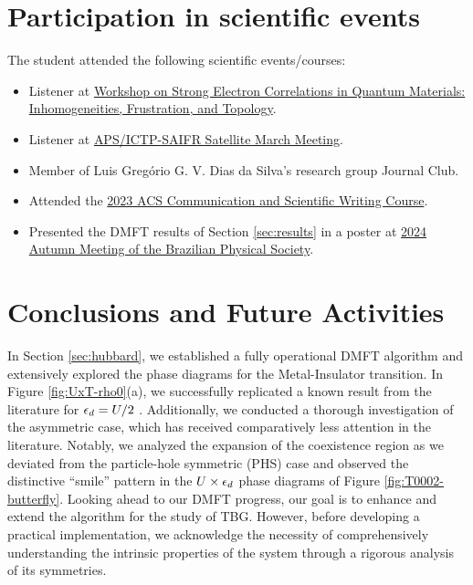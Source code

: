 \documentclass[12pt]{report}
\begin{document}
\chapter{Participation in scientific events} \label{chp:particEvento}

The student attended the following scientific events/courses:

\begin{itemize}
\item Listener at \href{https://www.ictp-saifr.org/qm2023/}{Workshop on Strong Electron Correlations in Quantum Materials: Inhomogeneities, Frustration, and Topology}.
\item Listener at \href{https://www.ictp-saifr.org/apsmarch23/}{APS/ICTP-SAIFR Satellite March Meeting}.
\item Member of Luis Gregório G. V. Dias da Silva's research group Journal Club.
\item Attended the \href{https://american-chemical-society.zoom.us/webinar/register/WN_FISEv0_ySkK2jPVB0nbsRw#/registration}{2023 ACS Communication and Scientific Writing Course}.
\item Presented the DMFT results of Section \ref{sec:results} in a poster at \href{https://www1.fisica.org.br/~eosbf/2024/index.php/en/}{2024 Autumn Meeting of the Brazilian Physical Society}.
\end{itemize}


\chapter{Conclusions and Future Activities} \label{chp:conclusions}

In Section \ref{sec:hubbard}, we established a fully operational DMFT algorithm and extensively explored the phase diagrams for the Metal-Insulator transition. In Figure \ref{fig:UxT-rho0}(a), we successfully replicated a known result from the literature for $\epsilon_d = U/2$ \cite{georges1996}. Additionally, we conducted a thorough investigation of the asymmetric case, which has received comparatively less attention in the literature. Notably, we analyzed the expansion of the coexistence region as we deviated from the particle-hole symmetric (PHS) case and observed the distinctive ``smile'' pattern in the $U \times \epsilon_d$ phase diagrams of Figure \ref{fig:T0002-butterfly}. Looking ahead to our DMFT progress, our goal is to enhance and extend the algorithm for the study of TBG. However, before developing a practical implementation, we acknowledge the necessity of comprehensively understanding the intrinsic properties of the system through a rigorous analysis of its symmetries.
\end{document}
